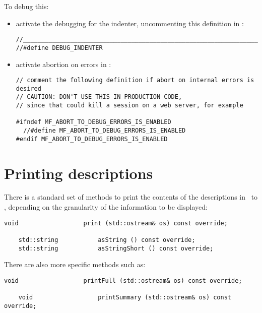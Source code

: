 To debug this:
\begin{itemize}
\item activate the debugging for the indenter, uncommenting this definition in :
\begin{lstlisting}[language=CPlusplus]
//______________________________________________________________________________
//#define DEBUG_INDENTER
\end{lstlisting}

\item activate abortion on errors in :
\begin{lstlisting}[language=CPlusPlus]
// comment the following definition if abort on internal errors is desired
// CAUTION: DON'T USE THIS IN PRODUCTION CODE,
// since that could kill a session on a web server, for example

#ifndef MF_ABORT_TO_DEBUG_ERRORS_IS_ENABLED
  //#define MF_ABORT_TO_DEBUG_ERRORS_IS_ENABLED
#endif MF_ABORT_TO_DEBUG_ERRORS_IS_ENABLED
\end{lstlisting}


\end{itemize}


\section{Printing descriptions}

There is a standard set of methods to print the contents of the descriptions in \mf\ to \standardOutput, depending on the granularity of the information to be displayed:
\begin{lstlisting}[language=CPlusPlus]
    void                  print (std::ostream& os) const override;

    std::string           asString () const override;
    std::string           asStringShort () const override;
\end{lstlisting}

There are also more specific methods such as:
\begin{lstlisting}[language=CPlusPlus]
    void                  printFull (std::ostream& os) const override;

    void                  printSummary (std::ostream& os) const override;
\end{lstlisting}

